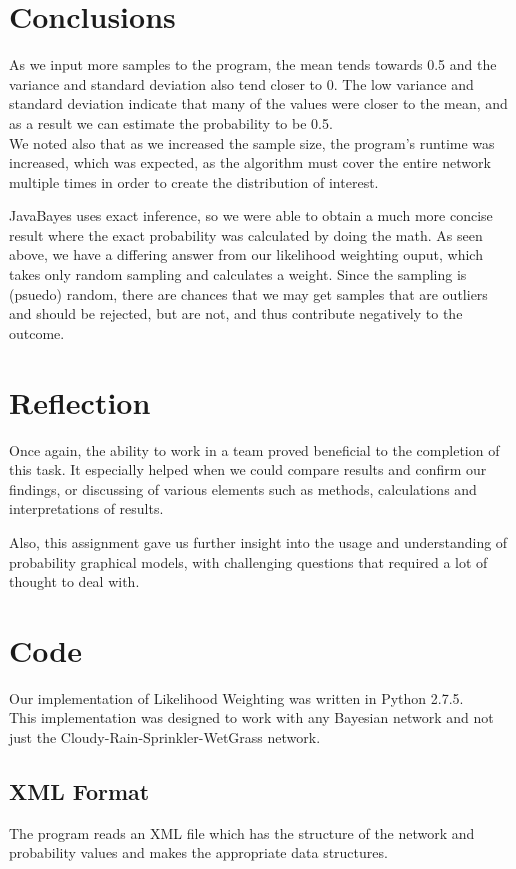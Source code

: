 \documentclass{article}
\begin{document}
\section{Conclusions}
As we input more samples to the program, the mean tends towards 0.5 and the variance and standard deviation also tend closer to 0. The low variance and standard deviation indicate that many of the values were closer to the mean, and as a result we can estimate the probability to be 0.5. \\
We noted also that as we increased the sample size, the program's runtime was increased, which was expected, as the algorithm must cover the entire network multiple times in order to create the distribution of interest. 

JavaBayes uses exact inference, so we were able to obtain a much more concise result where the exact probability was calculated by doing the math. As seen above, we have a differing answer from our likelihood weighting ouput, which takes only random sampling and calculates a weight. Since the sampling is (psuedo) random, there are chances that we may get samples that are outliers and should be rejected, but are not, and thus contribute negatively to the outcome.

\section{Reflection}
Once again, the ability to work in a team proved beneficial to the completion of this task. It especially helped when we could compare results and confirm our findings, or discussing of various elements such as methods, calculations and interpretations of results. 

Also, this assignment gave us further insight into the usage and understanding of probability graphical models, with challenging questions that required a lot of thought to deal with.  
\section{Code}
Our implementation of Likelihood Weighting was written in Python 2.7.5.\\

This implementation was designed to work with any Bayesian network and not just the Cloudy-Rain-Sprinkler-WetGrass network.

\subsection{XML Format}
The program reads an XML file which has the structure of the network and probability values and makes the appropriate data structures.\\
\end{document}
